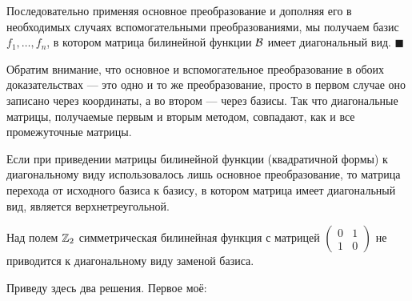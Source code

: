 Последовательно применяя основное преобразование и дополняя его в необходимых случаях вспомогательными преобразованиями, мы получаем базис $f_1, \ldots, f_n$, в котором матрица билинейной функции $\mathcal{B}$ имеет диагональный вид.
\hfill$\blacksquare$\par\smallskip

Обратим внимание, что основное и вспомогательное преобразование в обоих доказательствах --- это одно и то же преобразование, просто в первом случае оно записано через координаты, а во втором --- через базисы. Так что диагональные матрицы, получаемые первым и вторым методом, совпадают, как и все промежуточные матрицы.

\begin{remark}
    Если при приведении матрицы билинейной функции (квадратичной формы) к диагональному виду использовалось лишь основное преобразование, то матрица перехода от исходного базиса к базису, в котором матрица имеет диагональный вид, является верхнетреугольной.
\end{remark}

\begin{problem}[А.\,А. Клячко]
    Над полем $\mathbb{Z}_2$ симметрическая билинейная функция с матрицей
    $
    \begin{pmatrix}
        0 & 1\\
        1 & 0
    \end{pmatrix}
    $
    не приводится к диагональному виду заменой базиса.
\end{problem}

Приведу здесь два решения. Первое моё:


